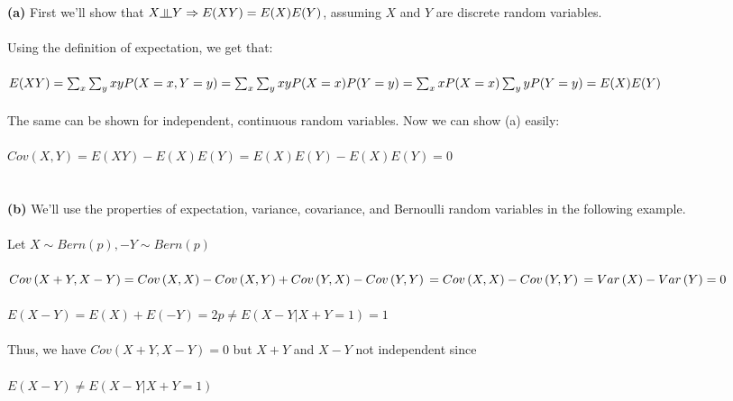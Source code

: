 \documentclass[submit]{harvardml}
\newcommand{\indep}{\rotatebox[origin=c]{90}{$\models$}}
\begin{document}
\textbf{(a)} First we'll show that $X \indep Y \Rightarrow E(XY)=E(X)E(Y)$, assuming $X$ and $Y$ are discrete random variables.\\\\
Using the definition of expectation, we get that:\\\\
$E(XY) = \sum_{x}\sum_{y}xyP(X=x,Y=y)\\\\=\sum_{x}\sum_{y}xyP(X=x)P(Y=y)\\\\=\sum_{x}xP(X=x)\sum_{y}yP(Y=y)\\\\=E(X)E(Y)$\\\\
The same can be shown for independent, continuous random variables. Now we can show (a) easily:\\\\
$Cov(X,Y)=E(XY)-E(X)E(Y)=E(X)E(Y)-E(X)E(Y)=0$\\\\\\



\textbf{(b)} We'll use the properties of expectation, variance, covariance, and Bernoulli random variables in the following example. \\\\
Let $X\sim Bern\left(p\right),-Y\sim Bern\left(p\right)$ \\\\
$Cov\left(X+Y,X-Y\right)=Cov\left(X,X\right)-Cov\left(X,Y\right)+Cov\left(Y,X\right)-Cov\left(Y,Y\right)\\\\=Cov\left(X,X\right)-Cov\left(Y,Y\right)\\\\=Var\left(X\right)-Var\left(Y\right)=0$\\\\$E\left(X-Y\right)=E\left(X\right)+E\left(-Y\right)=2p\neq E\left(X-Y|X+Y=1\right)=1$ \\\\
Thus, we have $Cov(X+Y,X-Y)=0$ but $X+Y$ and $X-Y$ not independent since \\\\$E(X-Y)\neq E(X-Y|X+Y=1)$ \\\\\\
\end{document}
